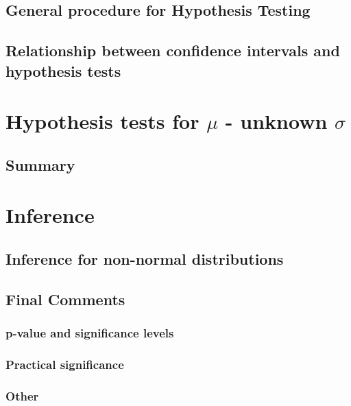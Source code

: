 \subsection{General procedure for Hypothesis Testing}  %
\subsection{Relationship between confidence intervals and hypothesis tests}  %

\section{Hypothesis tests for \(\mu\) - unknown $\sigma$}  %
\subsection{Summary}  %

\section{Inference}  %
\subsection{Inference for non-normal distributions}  %
\subsection{Final Comments}  %
\subsubsection{p-value and significance levels}  %
\subsubsection{Practical significance}  %
\subsubsection{Other}  %
